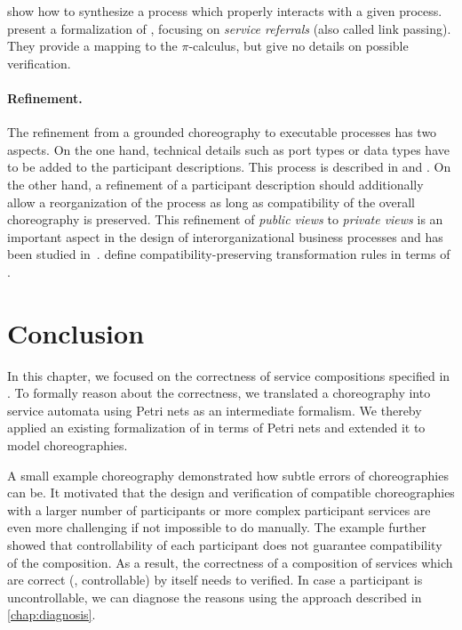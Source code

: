 \citet{MoserMHM06} show how to synthesize a  process which properly interacts with a given  process.
\citet{DeckerKP_2007_yrsoc} present a formalization of \bpelchor{}, focusing on \emph{service referrals} (also called link passing). They provide a mapping to the $\pi$-calculus, but give no details on possible verification.


\paragraph{Refinement.}

The refinement from a grounded \bpelchor{} choreography to executable  processes has two aspects. On the one hand, technical details such as  port types or data types have to be added to the participant descriptions. This process is described in \citet{ReimannKDL_2008_tr0807} and \citet{DeckerKLW_2009_dke}. On the other hand, a refinement of a participant description should additionally allow a reorganization of the  process as long as compatibility of the overall choreography is preserved. This refinement of \emph{public views} to \emph{private views} is an important aspect in the design of interorganizational business processes and has been studied in~\citet{AalstLMSW_2007_wsfm,AalstLMSW_2008_compj}. \citet{KoenigLMSW_2008_www} define compatibility-preserving transformation rules in terms of .




\section{Conclusion}\label{sec:ver:conclusion}

In this chapter, we focused on the correctness of service compositions specified in \bpelchor. To formally reason about the correctness, we translated a \bpelchor{} choreography into service automata using Petri nets as an intermediate formalism. We thereby applied an existing formalization of  in terms of Petri nets and extended it to model \bpelchor{} choreographies.

A small example choreography demonstrated how subtle errors of choreographies can be. It motivated that the design and verification of compatible choreographies with a larger number of participants or more complex participant services are even more challenging if not impossible to do manually. The example further showed that controllability of each participant does not guarantee compatibility of the composition. As a result, the correctness of a composition of services which are correct (\ie, controllable) by itself needs to verified. In case a participant is uncontrollable, we can diagnose the reasons using the approach described in \autoref{chap:diagnosis}.

